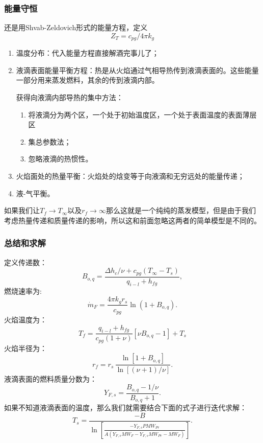 \subsubsection{能量守恒}
还是用Shvab-Zeldovich形式的能量方程，定义
\begin{equation}
    Z_T = c_{pg}/4\pi k_g
\end{equation}
\begin{enumerate}
    \item 温度分布：代入能量方程直接解酒完事儿了；
    \item 液滴表面能量平衡方程：热是从火焰通过气相导热传到液滴表面的。这些能量一部分用来蒸发燃料，其余的传到液滴内部。
    
    获得向液滴内部导热的集中方法：
    \begin{enumerate}
        \item 将液滴分为两个区，一个处于初始温度区，一个处于表面温度的表面薄层区
        \item 集总参数法；
        \item 忽略液滴的热惯性。
    \end{enumerate}
    \item 火焰面处的热量平衡：火焰处的焓变等于向液滴和无穷远处的能量传递；
    \item 液-气平衡。
\end{enumerate}

如果我们让\(T_f\to T_\infty\)以及\(r_f\to\infty\)那么这就是一个纯纯的蒸发模型，但是由于我们考虑热量传递和质量传递的影响，所以这和前面忽略这两者的简单模型是不同的。

\subsubsection{总结和求解}
定义传递数：
\begin{equation}
    B_{o,q}=\frac{\Delta h_{c}/\nu+c_{p g}\left(T_{\infty}-T_{s}\right)}{q_{i-l}+h_{f g}},
\end{equation}
燃烧速率为:
\begin{equation}
    \dot{m}_{F}=\frac{4\pi k_{g}r_{s}}{c_{p g}}\ln(1+B_{o,q}).
\end{equation}
火焰温度为：
\begin{equation}
    T_{f}=\frac{q_{i-l}+h_{f g}}{c_{p g}(1+\nu)}[{\nu}B_{o,q}-1]+T_{s}
\end{equation}
火焰半径为：
\begin{equation}
    r_{f}=r_{s}\,{\frac{\ln[1+B_{o,q}]}{\ln[(\nu+1)/\nu]}}.
\end{equation}
液滴表面的燃料质量分数为：
\begin{equation}
    Y_{F,s}=\frac{B_{o,q}-1/\nu}{B_{o,q}+1}.
\end{equation}
如果不知道液滴表面的温度，那么我们就需要结合下面的式子进行迭代求解：
\begin{equation}
    T_{s}=\frac{-B}{\ln\!\left[\frac{-Y_{F,s}P M W_{P r}}{A(Y_{F,s}M W_{F}-Y_{F,s}M W_{P r}-M W_{F})}\right]}.
\end{equation}

